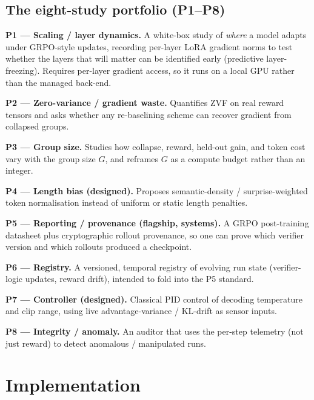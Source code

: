 \documentclass[12pt,a4paper]{report}
\begin{document}
\subsection{The eight-study portfolio (P1--P8)}

\textbf{P1 --- Scaling / layer dynamics.} A white-box study of \emph{where} a model
adapts under GRPO-style updates, recording per-layer LoRA gradient norms to test
whether the layers that will matter can be identified early (predictive
layer-freezing). Requires per-layer gradient access, so it runs on a local GPU
rather than the managed back-end.

\textbf{P2 --- Zero-variance / gradient waste.} Quantifies ZVF on real reward
tensors and asks whether any re-baselining scheme can recover gradient from
collapsed groups.

\textbf{P3 --- Group size.} Studies how collapse, reward, held-out gain, and token
cost vary with the group size $G$, and reframes $G$ as a compute budget rather
than an integer.

\textbf{P4 --- Length bias (designed).} Proposes semantic-density / surprise-weighted
token normalisation instead of uniform or static length penalties.

\textbf{P5 --- Reporting / provenance (flagship, systems).} A GRPO post-training
datasheet plus cryptographic rollout provenance, so one can prove which verifier
version and which rollouts produced a checkpoint.


\textbf{P6 --- Registry.} A versioned, temporal registry of evolving run state
(verifier-logic updates, reward drift), intended to fold into the P5 standard.

\textbf{P7 --- Controller (designed).} Classical PID control of decoding temperature
and clip range, using live advantage-variance / KL-drift as sensor inputs.

\textbf{P8 --- Integrity / anomaly.} An auditor that uses the per-step telemetry
(not just reward) to detect anomalous / manipulated runs.

\section{Implementation}
\label{sec:impl}
\end{document}
